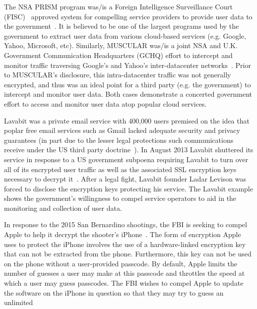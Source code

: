\begin{packed_desc}
\item[PRISM and MUSCULAR:] The NSA PRISM program was/is a Foreign
  Intelligence Surveillance Court (FISC)~\cite{fisc} approved system
  for compelling service providers to provide user data to the
  government~\cite{greenwald-prism}. It is believed to be one of the
  largest programs used by the government to extract user data from
  various cloud-based services (e.g. Google, Yahoo, Microsoft,
  etc). Similarly, MUSCULAR was/is a joint NSA and U.K. Government
  Communication Headquarters (GCHQ) effort to intercept and monitor
  traffic traversing Google's and Yahoo's inter-datacenter
  networks~\cite{gellman-muscular}. Prior to MUSCULAR's disclosure,
  this intra-datacenter traffic was not generally encrypted, and thus
  was an ideal point for a third party (e.g. the government) to
  intercept and monitor user data. Both cases demonstrate a concerted
  government effort to access and monitor user data atop popular cloud
  services.
\item[Lavabit:] Lavabit was a private email service with 400,000 users
  premised on the idea that poplar free email services such as Gmail
  lacked adequate security and privacy guarantees (in part due to the
  lesser legal protections such communications receive under the US
  third party doctrine~\cite{thompson-thirdparty}). In August 2013
  Lavabit shuttered its service in response to a US government
  subpoena requiring Lavabit to turn over all of its encrypted user
  traffic as well as the associated SSL encryption keys necessary to
  decrypt it~\cite{lavabit, levsion-lavabit}. After a legal fight,
  Lavabit founder Ladar Levison was forced to disclose the encryption
  keys protecting his service. The Lavabit example shows the
  government's willingness to compel service operators to aid in the
  monitoring and collection of user data.
\item[Apple v. FBI:] In response to the 2015 San Bernardino shootings,
  the FBI is seeking to compel Apple to help it decrypt the shooter's
  iPhone~\cite{ars-cookvfbi}. The form of encryption Apple uses to
  protect the iPhone involves the use of a hardware-linked encryption
  key that can not be extracted from the phone. Furthermore, this key
  can not be used on the phone without a user-provided passcode. By
  default, Apple limits the number of guesses a user may make at this
  passcode and throttles the speed at which a user may guess
  passcodes. The FBI wishes to compel Apple to update the software on
  the iPhone in question so that they may try to guess an unlimited

\end{packed_desc}
